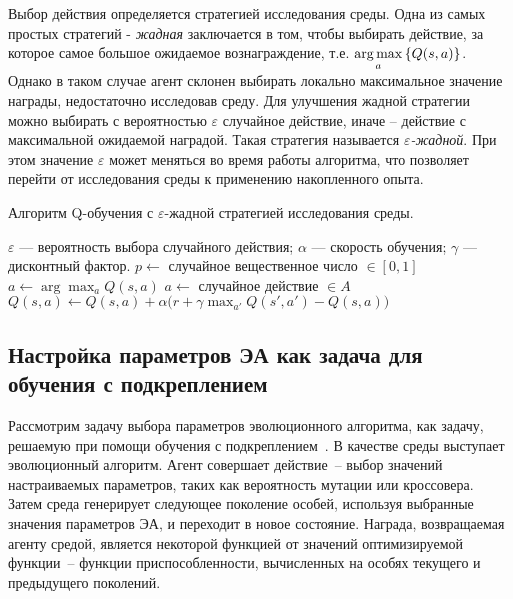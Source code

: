 Выбор действия определяется стратегией исследования среды. Одна из самых простых стратегий - \textit{жадная} заключается в том, чтобы выбирать действие, за которое самое большое ожидаемое вознаграждение, т.е. $\operatorname*{arg\,max}\limits_a{\{Q(s, a)\}}$. Однако в таком случае агент склонен выбирать локально максимальное значение награды, недостаточно исследовав среду. Для улучшения жадной стратегии можно выбирать с вероятностью $\varepsilon$ случайное действие, иначе -- действие с максимальной ожидаемой наградой. Такая стратегия называется $\varepsilon$\textit{-жадной}. При этом значение $\varepsilon$ может меняться во время работы алгоритма, что позволяет перейти от исследования среды к применению накопленного опыта.

\begin{algorithm}[h!]
    \caption{Алгоритм Q-обучения с $\varepsilon$-жадной стратегией исследования среды.}
    \label{q_learning}
    \begin{algorithmic}[1]
    \REQUIRE  
        $\varepsilon$ --- вероятность выбора случайного действия;
        $\alpha$ --- скорость обучения;
        $\gamma$ --- дисконтный фактор.
        \STATE $p \gets ${ случайное вещественное число} $\in [0, 1]$
            \STATE $a \gets \arg \max_{a}{Q(s,a)}$
        \ELSE 
            \STATE $a \gets$ { случайное действие } $\in A$
        \ENDIF
        \STATE $Q(s,a) \gets Q(s,a) + \alpha(r + \gamma \max_{a'}{Q(s',a') - Q(s, a))}$
    \ENDWHILE
    \end{algorithmic}
\end{algorithm}

\subsection{Настройка параметров ЭА как задача для обучения с подкреплением}
Рассмотрим задачу выбора параметров эволюционного алгоритма, как задачу, решаемую при помощи обучения с подкреплением~\cite{eiben_2}. В качестве среды выступает эволюционный алгоритм. Агент совершает действие~-- выбор значений настраиваемых параметров, таких как вероятность мутации или кроссовера. Затем среда генерирует следующее поколение особей, используя выбранные значения параметров ЭА, и переходит в новое состояние. Награда, возвращаемая агенту средой, является некоторой функцией от значений оптимизируемой функции~-- функции приспособленности, вычисленных на особях текущего и предыдущего поколений.

